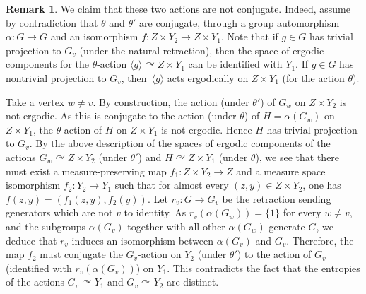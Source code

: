 \documentclass[JEP,XML,SOM,Unicode,NoFloatCountersInSection,published]{cedram}
\theoremstyle{plain}
\theoremstyle{definition}
\newtheorem{rk}[theo]{Remark}
\let\actson\curvearrowright
\begin{document}
\begin{rk}
We claim that these two actions are not conjugate. Indeed, assume by contradiction that $\theta$ and $\theta'$ are conjugate, through a group automorphism $\alpha:G\to G$ and an isomorphism $f:Z\times Y_2\to Z\times Y_1$. Note that if $g\in G$ has trivial projection to $G_v$ (under the natural retraction), then the space of ergodic components for the $\theta$-action $\langle g\rangle \actson Z\times Y_1$ can be identified with $Y_1$. If $g\in G$ has nontrivial projection to $G_v$, then~$\langle g\rangle$ acts ergodically on $Z\times Y_1$ (for the action $\theta$).

Take a vertex $w\neq v$. By construction, the action (under $\theta'$) of $G_w$ on $Z\times Y_2$ is not ergodic. As this is conjugate to the action (under $\theta$) of $H=\alpha(G_w)$ on $Z\times Y_1$, the $\theta$-action of $H$ on $Z\times Y_1$ is not ergodic. Hence $H$ has trivial projection to $G_{v}$. By the above description of the spaces of ergodic components of the actions $G_w\actson Z\times Y_2$ (under $\theta'$) and $H\actson Z\times Y_1$ (under $\theta$), we see that there must exist a measure-preserving map $f_1:Z\times Y_2\to Z$ and a measure space isomorphism $f_2:Y_2\to Y_1$ such that for almost every $(z,y)\in Z\times Y_2$, one has $f(z,y)=(f_1(z,y),f_2(y))$. Let $r_v:G\to G_v$ be the retraction sending generators which are not $v$ to identity. As $r_v(\alpha(G_w))=\{1\}$ for every $w\neq v$, and the subgroups $\alpha(G_v)$ together with all other $\alpha(G_w)$ generate $G$, we deduce that $r_v$ induces an isomorphism between $\alpha(G_v)$ and $G_v$. Therefore, the map $f_2$ must conjugate the $G_v$-action on $Y_2$ (under $\theta'$) to the action of $G_v$ (identified with $r_v(\alpha(G_v))$) on $Y_1$. This contradicts the fact that the entropies of the actions $G_v\actson Y_1$ and $G_v\actson Y_2$ are distinct.


\end{rk}
\end{document}

